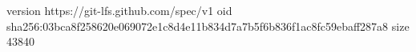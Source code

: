 version https://git-lfs.github.com/spec/v1
oid sha256:03bca8f258620e069072e1c8d4e11b834d7a7b5f6b836f1ac8fc59ebaff287a8
size 43840
